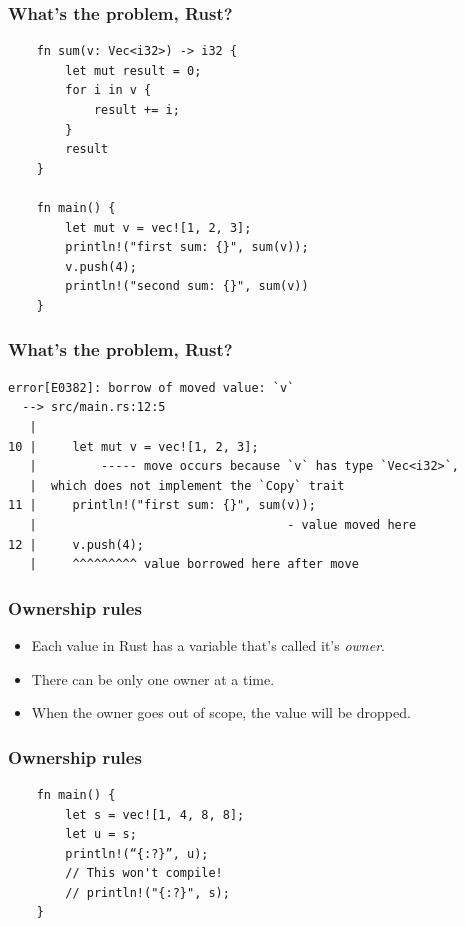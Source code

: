 \documentclass[aspectratio=1610,t]{beamer}
\begin{document}
\begin{frame}[fragile]
\frametitle{What's the problem, Rust?}
\begin{verbatim}
    fn sum(v: Vec<i32>) -> i32 {
        let mut result = 0;
        for i in v {
            result += i;
        }
        result
    }

    fn main() {
        let mut v = vec![1, 2, 3];
        println!("first sum: {}", sum(v));
        v.push(4);
        println!("second sum: {}", sum(v))
    }
\end{verbatim}
\end{frame}


\begin{frame}[fragile]
\frametitle{What's the problem, Rust?}
\begin{verbatim}
error[E0382]: borrow of moved value: `v`
  --> src/main.rs:12:5
   |
10 |     let mut v = vec![1, 2, 3];
   |         ----- move occurs because `v` has type `Vec<i32>`,
   |  which does not implement the `Copy` trait
11 |     println!("first sum: {}", sum(v));
   |                                   - value moved here
12 |     v.push(4);
   |     ^^^^^^^^^ value borrowed here after move
\end{verbatim}
\end{frame}


\begin{frame}[fragile]
\frametitle{Ownership rules}
\begin{itemize}
    \item Each value in Rust has a variable that's called it's \textit{owner}.
    \item There can be only one owner at a time.
    \item When the owner goes out of scope, the value will be dropped.
\end{itemize}
\end{frame}


\begin{frame}[fragile]
\frametitle{Ownership rules}
\begin{verbatim}
    fn main() {
        let s = vec![1, 4, 8, 8];
        let u = s;
        println!(“{:?}”, u);
        // This won't compile!
        // println!("{:?}", s);
    }
\end{verbatim}
\end{frame}
\end{document}
